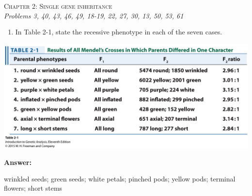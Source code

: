 \documentclass[11pt,]{article}
\providecommand{\tightlist}{%
  \setlength{\itemsep}{0pt}\setlength{\parskip}{0pt}}
\begin{document}
\begin{center}
\Large{\textsc{Chapter 2: Single gene
inheritance}}\\ \small{\textit{Problems 3, 40, 43, 46, 49, 18-19, 22,
27, 30, 13, 50, 53, 61}}\\
\vspace*{\baselineskip}
\end{center}

\begin{blackbox}

\begin{enumerate}
\def\labelenumi{\arabic{enumi}.}
\setcounter{enumi}{2}
\tightlist
\item
  In Table 2-1, state the recessive phenotype in each of the seven
  cases.
\end{enumerate}

\begin{center}\includegraphics[width=0.35\linewidth,]{input/table_02_01} \end{center}

\textbf{Answer:}

wrinkled seeds; green seeds; white petals; pinched pods; yellow pods;
terminal flowers; short stems

\end{blackbox}
\end{document}
